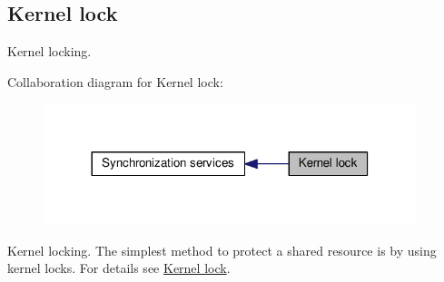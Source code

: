 \hypertarget{group__lock__intf}{\subsection{Kernel lock}
\label{group__lock__intf}
}


Kernel locking.  


Collaboration diagram for Kernel lock\-:\nopagebreak
\begin{figure}[H]
\begin{center}
\leavevmode
\includegraphics[width=308pt]{group__lock__intf}
\end{center}
\end{figure}
Kernel locking. The simplest method to protect a shared resource is by using kernel locks. For details see \hyperlink{group__kern__lock}{Kernel lock}. 